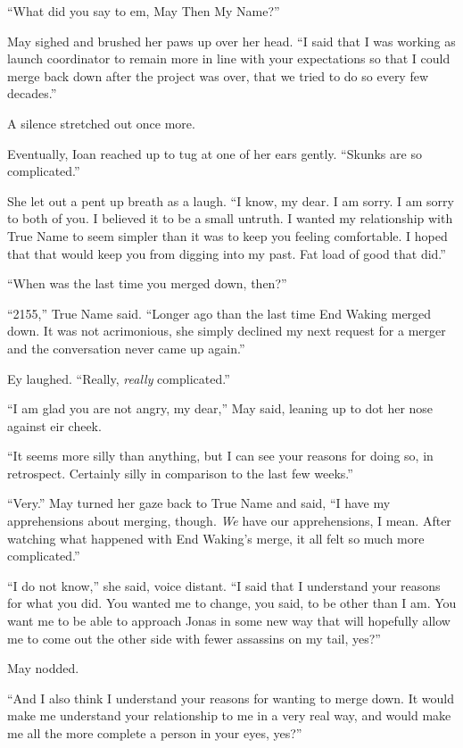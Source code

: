 ``What did you say to em, May Then My Name?''

May sighed and brushed her paws up over her head. ``I said that I was working as launch coordinator to remain more in line with your expectations so that I could merge back down after the project was over, that we tried to do so every few decades.''

A silence stretched out once more.

Eventually, Ioan reached up to tug at one of her ears gently. ``Skunks are so complicated.''

She let out a pent up breath as a laugh. ``I know, my dear. I am sorry. I am sorry to both of you. I believed it to be a small untruth. I wanted my relationship with True Name to seem simpler than it was to keep you feeling comfortable. I hoped that that would keep you from digging into my past. Fat load of good that did.''

``When was the last time you merged down, then?''

``2155,'' True Name said. ``Longer ago than the last time End Waking merged down. It was not acrimonious, she simply declined my next request for a merger and the conversation never came up again.''

Ey laughed. ``Really, \emph{really} complicated.''

``I am glad you are not angry, my dear,'' May said, leaning up to dot her nose against eir cheek.

``It seems more silly than anything, but I can see your reasons for doing so, in retrospect. Certainly silly in comparison to the last few weeks.''

``Very.'' May turned her gaze back to True Name and said, ``I have my apprehensions about merging, though. \emph{We} have our apprehensions, I mean. After watching what happened with End Waking's merge, it all felt so much more complicated.''

``I do not know,'' she said, voice distant. ``I said that I understand your reasons for what you did. You wanted me to change, you said, to be other than I am. You want me to be able to approach Jonas in some new way that will hopefully allow me to come out the other side with fewer assassins on my tail, yes?''

May nodded.

``And I also think I understand your reasons for wanting to merge down. It would make me understand your relationship to me in a very real way, and would make me all the more complete a person in your eyes, yes?''


